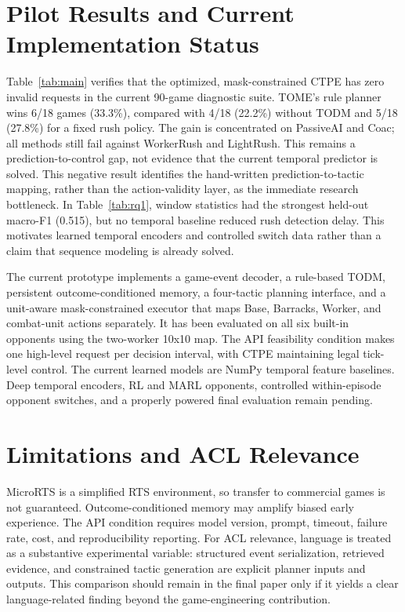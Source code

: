 \documentclass[11pt]{article}
\begin{document}
\section{Pilot Results and Current Implementation Status}

Table~\ref{tab:main} verifies that the optimized, mask-constrained CTPE has zero
invalid requests in the current 90-game diagnostic suite. TOME's rule planner
wins 6/18 games (33.3\%), compared with 4/18 (22.2\%) without TODM and 5/18
(27.8\%) for a fixed rush policy. The gain is concentrated on PassiveAI and
Coac; all methods still fail against WorkerRush and LightRush. This remains a
prediction-to-control gap, not evidence that the current temporal predictor is
solved.
This negative result identifies the hand-written prediction-to-tactic mapping,
rather than the action-validity layer, as the immediate research bottleneck.
In Table~\ref{tab:rq1}, window statistics had the strongest held-out macro-F1
(0.515), but no temporal baseline reduced rush detection delay. This motivates
learned temporal encoders and controlled switch data rather than a claim that
sequence modeling is already solved.

The current prototype implements a game-event decoder, a rule-based TODM,
persistent outcome-conditioned memory, a four-tactic planning interface, and a
unit-aware mask-constrained executor that maps Base, Barracks, Worker, and
combat-unit actions separately. It has been evaluated on all six built-in
opponents using the two-worker 10x10 map. The API feasibility condition makes
one high-level request per decision interval, with CTPE maintaining legal
tick-level control.
The current learned models are NumPy temporal feature baselines. Deep temporal
encoders, RL and MARL opponents, controlled within-episode opponent switches,
and a properly powered final evaluation remain pending.

\section{Limitations and ACL Relevance}

MicroRTS is a simplified RTS environment, so transfer to commercial games is
not guaranteed. Outcome-conditioned memory may amplify biased early experience.
The API condition requires model version, prompt, timeout, failure rate, cost,
and reproducibility reporting. For ACL relevance, language is treated as a
substantive experimental variable: structured event serialization, retrieved
evidence, and constrained tactic generation are explicit planner inputs and
outputs. This comparison should remain in the final paper only if it yields a
clear language-related finding beyond the game-engineering contribution.
\end{document}
